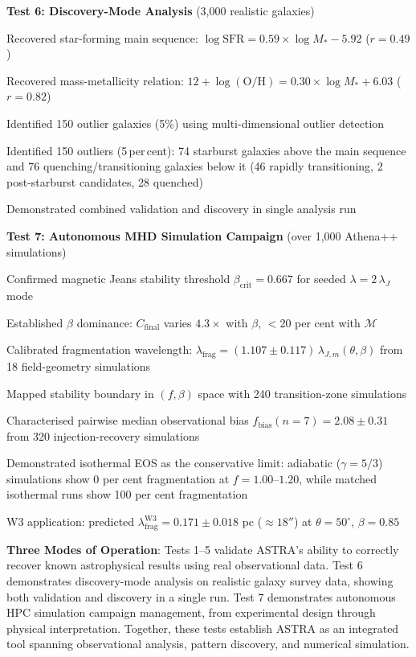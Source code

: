 \documentclass[usenatbib]{rasti}
\begin{document}
\textbf{Test 6: Discovery-Mode Analysis} (3,000 realistic galaxies)
\begin{description}
\item Recovered star-forming main sequence: $\log \text{SFR} = 0.59 \times \log M_* - 5.92$ ($r = 0.49$)
\item Recovered mass-metallicity relation: $12 + \log(\text{O/H}) = 0.30 \times \log M_* + 6.03$ ($r = 0.82$)
\item Identified 150 outlier galaxies (5\%) using multi-dimensional outlier detection
\item Identified 150 outliers (5\,per\,cent): 74 starburst galaxies above the main sequence and 76 quenching/transitioning galaxies below it (46 rapidly transitioning, 2 post-starburst candidates, 28 quenched)
\item Demonstrated combined validation and discovery in single analysis run
\end{description}

\textbf{Test 7: Autonomous MHD Simulation Campaign} (over 1,000 Athena++ simulations)
\begin{description}
\item Confirmed magnetic Jeans stability threshold $\beta_\mathrm{crit} = 0.667$ for seeded $\lambda = 2\,\lambda_J$ mode
\item Established $\beta$ dominance: $C_\mathrm{final}$ varies $4.3\times$ with $\beta$, $<$20 per cent with $\mathcal{M}$
\item Calibrated fragmentation wavelength: $\lambda_\mathrm{frag} = (1.107 \pm 0.117)\,\lambda_{J,m}(\theta,\beta)$ from 18 field-geometry simulations
\item Mapped stability boundary in $(f, \beta)$ space with 240 transition-zone simulations
\item Characterised pairwise median observational bias $f_\mathrm{bias}(n=7) = 2.08 \pm 0.31$ from 320 injection-recovery simulations
\item Demonstrated isothermal EOS as the conservative limit: adiabatic ($\gamma=5/3$) simulations show 0 per cent fragmentation at $f=1.00$--$1.20$, while matched isothermal runs show 100 per cent fragmentation
\item W3 application: predicted $\lambda_\mathrm{frag}^{\mathrm{W3}} = 0.171 \pm 0.018$ pc ($\approx 18''$) at $\theta=50^\circ$, $\beta=0.85$
\end{description}

\textbf{Three Modes of Operation}: Tests 1--5 validate ASTRA's ability to correctly recover known astrophysical results using real observational data. Test 6 demonstrates discovery-mode analysis on realistic galaxy survey data, showing both validation and discovery in a single run. Test 7 demonstrates autonomous HPC simulation campaign management, from experimental design through physical interpretation. Together, these tests establish ASTRA as an integrated tool spanning observational analysis, pattern discovery, and numerical simulation.
\end{document}
